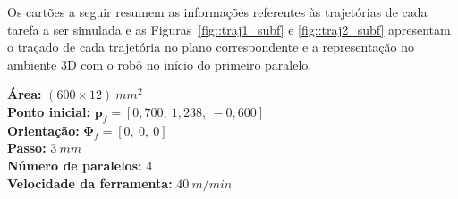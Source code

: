 Os cartões a seguir resumem as informações referentes às trajetórias de cada
tarefa a ser simulada e as Figuras~\ref{fig::traj1_subf} e \ref{fig::traj2_subf}
apresentam o traçado de cada trajetória no plano correspondente e a
representação no ambiente 3D com o robô no início do primeiro paralelo.
%
\newline
\begin{tcolorbox}
[colframe=black!75!white, colback=white, title = Tarefa 1 -- Plano xz] 
  \textbf{Área:} $(600 \times 12)~mm^2$ \\
  \textbf{Ponto inicial:} $\mathbf{p}_f = [0,700,~1,238,~-0,600]$ \\
  \textbf{Orientação:} $\boldsymbol{\Phi}_{f} = [0,~0,~0]$ \\
  \textbf{Passo:} $3~mm$ \\
  \textbf{Número de paralelos:} 4 \\
  \textbf{Velocidade da ferramenta:} $40~m/min$
\end{tcolorbox}
%
